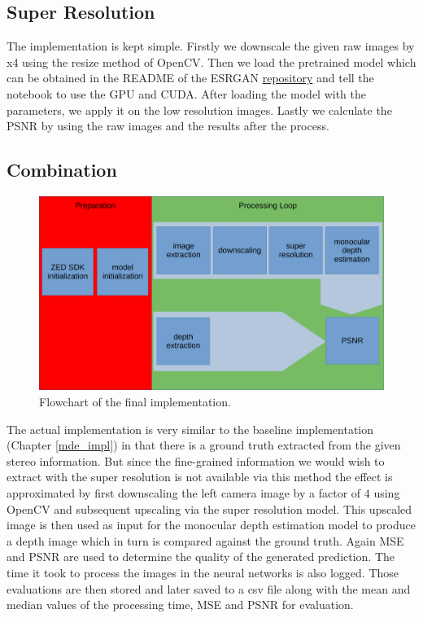 \subsection{Super Resolution}

The implementation is kept simple. Firstly we downscale the given raw images by x4 using the resize method of OpenCV. Then we load the pretrained model which can be obtained in the README of the ESRGAN \href{https://github.com/xinntao/ESRGAN}{repository} and tell the notebook to use the GPU and CUDA. After loading the model with the parameters, we apply it on the low resolution images. Lastly we calculate the PSNR by using the raw images and the results after the process.


\subsection{Combination}

\begin{figure}[ht!]
    \begin{center}
        \includegraphics[scale=.5]{resources/general_plan.pdf}
        \caption{Flowchart of the final implementation.} \label{flowchart_general}
    \end{center}
\end{figure}

The actual implementation is very similar to the baseline implementation (Chapter \ref*{mde_impl}) in that there is a ground truth extracted from the given stereo information. But since the fine-grained information we would wish to extract with the super resolution is not available via this method the effect is approximated by first downscaling the left camera image by a factor of $4$ using OpenCV and subsequent upscaling via the super resolution model. This upscaled image is then used as input for the monocular depth estimation model to produce a depth image which in turn is compared against the ground truth. Again MSE and PSNR are used to determine the quality of the generated prediction. The time it took to process the images in the neural networks is also logged. Those evaluations are then stored and later saved to a csv file along with the mean and median values of the processing time, MSE and PSNR for evaluation.

